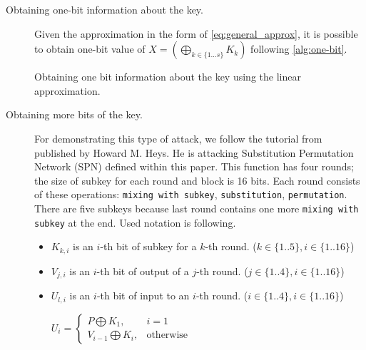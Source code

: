 \documentclass[
    digital,    %
    oneside,    %
    color,
    11pt,
    nocover,
    notable,
    nolof,
    nolot,
    final
]{fithesis3}
\renewcommand\_{\textunderscore\allowbreak}
\begin{document}
\begin{description}
	\item[Obtaining one-bit information about the key.] Given the approximation in the form of \cref{eq:general_approx}, it is possible to obtain one-bit value of $X = \left( \bigoplus_{k \in \{1...s\}} K_{k} \right)$ following \cref{alg:one-bit}. \cite{junod2000linear}
	
	\begin{algorithm}[H]

		
		\caption{Obtaining one bit information about the key using the linear approximation.} 
		\label{alg:one-bit}
	\end{algorithm}
	
	\item[Obtaining more bits of the key.] For demonstrating this type of attack, we follow the tutorial from \cite{human-cryptanalysis} published by Howard M. Heys. He is attacking Substitution Permutation Network (SPN) defined within this paper. This function has four rounds; the size of subkey for each round and block is 16 bits. Each round consists of these operations: \texttt{mixing with subkey}, \texttt{substitution}, \texttt{permutation}. There are five subkeys because last round contains one more \texttt{mixing with subkey} at the end. Used notation is following.
	
	\begin{itemize}
		\item $K_{k,i}$ is an $i$-th bit of subkey for a $k$-th round. ($k \in \{1..5\}, i \in \{1..16\}$)
		\item $V_{j,i}$ is an $i$-th bit of output of a $j$-th round. ($j \in \{1..4\}, i \in \{1..16\}$)
		\item $U_{l,i}$ is an $i$-th bit of input to an $i$-th round. ($i \in \{1..4\}, i \in \{1..16\}$)
		
		$U_{i} = \begin{cases}
		P \bigoplus K_{1}, & i = 1 \\
		V_{i-1} \bigoplus K_{i}, & \text{otherwise}
		\end{cases}
		$
	\end{itemize}


\end{description}
\end{document}
